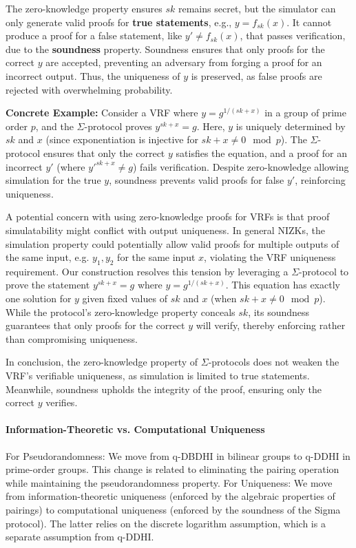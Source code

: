 The zero-knowledge property ensures $sk$ remains secret, but the simulator can only generate valid proofs for \textbf{true statements}, e.g., $y = f_{sk}(x)$. It cannot produce a proof for a false statement, like $y' \neq f_{sk}(x)$, that passes verification, due to the \textbf{soundness} property. Soundness ensures that only proofs for the correct $y$ are accepted, preventing an adversary from forging a proof for an incorrect output. Thus, the uniqueness of $y$ is preserved, as false proofs are rejected with overwhelming probability.

\textbf{Concrete Example:} Consider a VRF where $y = g^{1/(sk + x)}$ in a group of prime order $p$, and the $\Sigma$-protocol proves $y^{sk + x} = g$. Here, $y$ is uniquely determined by $sk$ and $x$ (since exponentiation is injective for $sk + x \neq 0 \mod p$). The $\Sigma$-protocol ensures that only the correct $y$ satisfies the equation, and a proof for an incorrect $y'$ (where $y'^{sk + x} \neq g$) fails verification. Despite zero-knowledge allowing simulation for the true $y$, soundness prevents valid proofs for false $y'$, reinforcing uniqueness.

A potential concern with using zero-knowledge proofs for VRFs is that proof simulatability might conflict with output uniqueness. In general NIZKs, the simulation property could potentially allow valid proofs for multiple outputs of the same input, e.g. $y_1, y_2$ for the same input $x$, violating the VRF uniqueness requirement. Our construction resolves this tension by leveraging a $\Sigma$-protocol to prove the statement $y^{sk + x} = g$ where $y = g^{1/(sk + x)}$. This equation has exactly one solution for $y$ given fixed values of $sk$ and $x$ (when $sk + x \neq 0 \mod p$). While the protocol's zero-knowledge property conceals $sk$, its soundness guarantees that only proofs for the correct $y$ will verify, thereby enforcing rather than compromising uniqueness.


In conclusion, the zero-knowledge property of $\Sigma$-protocols does not weaken the VRF's verifiable uniqueness, as simulation is limited to true statements. Meanwhile, soundness upholds the integrity of the proof, ensuring only the correct $y$ verifies.

\paragraph{Information-Theoretic vs. Computational Uniqueness} 
For Pseudorandomness: We move from q-DBDHI in bilinear groups to q-DDHI in prime-order groups. This change is related to eliminating the pairing operation while maintaining the pseudorandomness property.
For Uniqueness: We move from information-theoretic uniqueness (enforced by the algebraic properties of pairings) to computational uniqueness (enforced by the soundness of the Sigma protocol). The latter relies on the discrete logarithm assumption, which is a separate assumption from q-DDHI.


